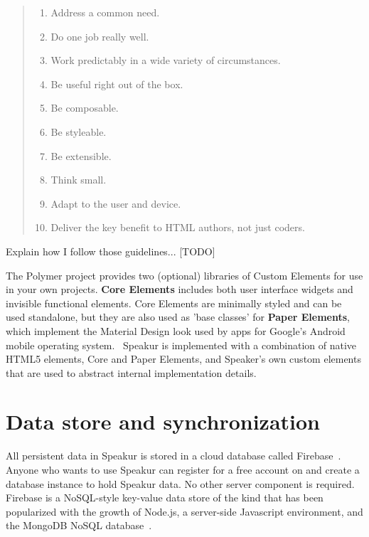 \begin{quote}
\begin{enumerate}
\item Address a common need.\label{wcp:commonneed}
\item Do one job really well.\label{wcp:onejob}
\item Work predictably in a wide variety of circumstances.\label{wcp:predicatable}
\item Be useful right out of the box.\label{wcp:useful}
\item Be composable.\label{wcp:composable}
\item Be styleable.\label{wcp:stylable}
\item Be extensible.\label{wcp:extensible}
\item Think small.\label{wcp:thinksmall}
\item Adapt to the user and device.\label{wcp:adaptable}
\item Deliver the key benefit to HTML authors, not just coders.\label{wcp:htmlauthors}
~\cite{webcomponentscontributors2014}
\end{enumerate}
\end{quote}

Explain how I follow those guidelines... [TODO]

The Polymer project provides two (optional) libraries of Custom Elements for use in your own projects. 
\textbf{Core Elements} includes both user interface
widgets and invisible functional elements.
Core Elements are minimally styled and can be used standalone, 
but they are also used as 'base classes' for 
\textbf{Paper Elements}, 
which implement the Material Design look used by apps for Google's Android mobile operating system.~\cite{imura2015}
Speakur is implemented with a combination of native HTML5 elements, 
Core and Paper Elements, 
and Speaker's own custom elements that are used to abstract internal implementation details.

\section{Data store and synchronization}
All persistent data in Speakur is stored in a cloud database called Firebase~\cite{firebasecontributors2015}.
Anyone who wants to use Speakur can register for a free account on  and create a database instance to hold Speakur data.
No other server component is required.
Firebase is a NoSQL-style key-value data store of the kind that has been popularized
with the growth of 
Node.js, a server-side Javascript environment,
and the MongoDB NoSQL database~\cite{dickey2014}.

